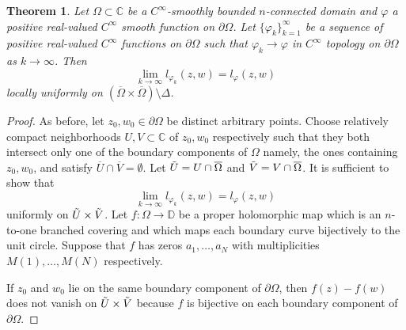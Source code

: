 \documentclass[11pt, reqno]{amsart}
\newtheorem{thm}{Theorem}[section]
\numberwithin{equation}{section}
\newcommand{\Om}{\Omega}
\begin{document}
	\begin{thm}
		Let $\Omega\subset\mathbb{C}$ be a $C^{\infty}$-smoothly bounded $n$-connected domain and $\varphi$ a positive real-valued $C^{\infty}$ smooth function on $\partial\Omega$. 
		Let $\{\varphi_k\}_{k=1}^{\infty}$ be a sequence of positive real-valued $C^{\infty}$ functions on $\partial\Omega$ such that $\varphi_k\rightarrow\varphi$ in $C^{\infty}$ topology on $\partial\Omega$ as $k\rightarrow\infty$. Then
		\begin{equation}
		\lim_{k\rightarrow\infty}l_{\varphi_k}(z,w) = l_{\varphi}(z,w)
		\end{equation}
		locally uniformly on $(\overline{\Om}\times\overline{\Om})\setminus\Delta$.
	\end{thm}
	
\begin{proof}
	As before, let $z_0,w_0\in\partial\Omega$ be distinct arbitrary points. Choose relatively compact neighborhoods $U, V\subset\mathbb{C}$ of $z_0, w_0$ respectively such that they both intersect only one of the boundary components of $\Omega$ namely, the ones containing $z_0, w_0$, and satisfy $\overline{U}\cap \overline{V} = \emptyset$. Let $\Tilde{U} = U\cap\overline{\Omega}$ and $\Tilde{V} = V\cap\overline{\Omega}$. It is sufficient to show that 
		\[
		\lim_{k\rightarrow\infty}l_{\varphi_k}(z,w) = l_{\varphi}(z,w) 
		\]
		uniformly on $\Tilde{U}\times\Tilde{V}$. Let $f:\Omega\rightarrow \mathbb{D}$ be a proper holomorphic map which is an $n$-to-one branched covering and which maps each boundary curve bijectively to the unit circle. Suppose that $f$ has zeros $a_1,\ldots,a_N$ with multiplicities $M(1),\ldots, M(N)$ respectively. 
        \medskip
        
        If $z_0$ and $w_0$ lie on the same boundary component of $\partial \Omega$, then $f(z)-f(w)$ does not vanish on $\Tilde{U}\times\Tilde{V}$ because $f$ is bijective on each boundary component of $\partial \Omega$. 

        \medskip
        

\end{proof}
\end{document}
